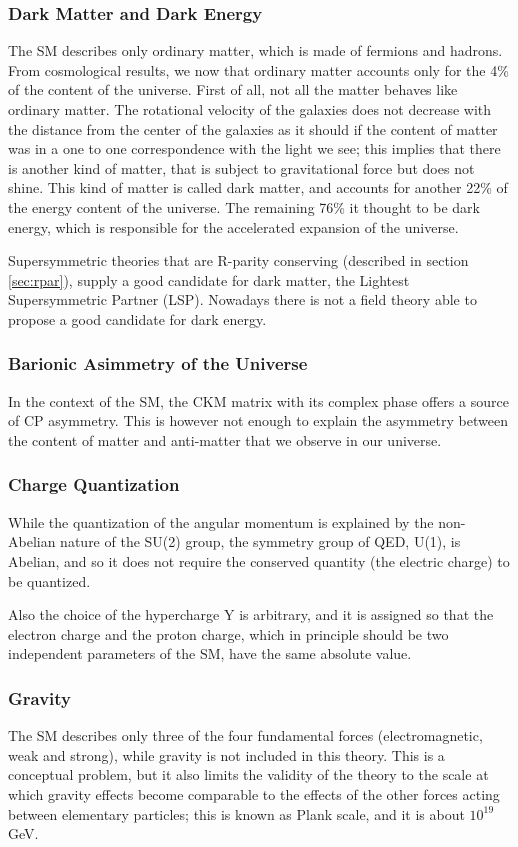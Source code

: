\subsubsection*{Dark Matter and Dark Energy}
The SM describes only ordinary matter, which is made of fermions and hadrons. From cosmological results, we now that ordinary matter accounts only for the 4\% of the content of the universe. First of all, not all the matter behaves like ordinary matter. The rotational velocity of the galaxies does not decrease with the distance from the center of the galaxies as it should if the content of matter was in a one to one correspondence with the light we see; this implies that there is another kind of matter, that is subject to gravitational force but does not shine. This kind of matter is called dark matter, and accounts for another 22\% of the energy content of the universe. The remaining 76\% it thought to be dark energy, which is responsible for the accelerated expansion of the universe.

Supersymmetric theories that are R-parity conserving (described in section \ref{sec:rpar}), supply a good candidate for dark matter, the Lightest Supersymmetric Partner (LSP). Nowadays there is not a field theory able to propose a good candidate for dark energy.


\subsubsection*{Barionic Asimmetry of the Universe}
In the context of the SM, the CKM matrix with its complex phase offers a source of CP asymmetry. This is however not enough to explain the asymmetry between the content of matter and anti-matter that we observe in our universe.

\subsubsection*{Charge Quantization}
While the quantization of the angular momentum is explained by the non-Abelian nature of the SU(2) group, the symmetry group of QED, U(1), is Abelian, and so it does not require the conserved quantity (the electric charge) to be quantized. 

Also the choice of the hypercharge Y is arbitrary, and it is assigned so that the electron charge and the proton charge, which in principle should be two independent parameters of the SM, have the same absolute value.

\subsubsection*{Gravity}
The SM describes only three of the four fundamental forces (electromagnetic, weak and strong), while gravity is not included in this theory. This is a conceptual problem, but it also limits the validity of the theory to the scale at which gravity effects become comparable to the effects of the other forces acting between elementary particles; this is known as Plank scale, and it is about $10^{19}$ GeV. 

